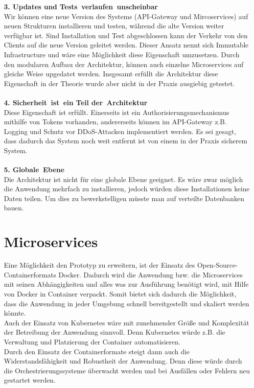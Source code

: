 \textbf{3. Updates und Tests verlaufen unscheinbar}\\
Wir können eine neue Version des Systems (API-Gateway und Mircoservices) auf neuen Strukturen installieren und testen, während die alte Version weiter verfügbar ist. Sind Installation und Test abgeschlossen kann der Verkehr von den Clients auf die neue Version geleitet werden. Dieser Ansatz nennt sich Immutable Infrastructure und wäre eine Möglichkeit diese Eigenschaft umzusetzen. Durch den modularen Aufbau der Architektur, können auch einzelne Microservices auf gleiche Weise upgedatet werden. Insgesamt erfüllt die Architektur diese Eigenschaft in der Theorie wurde aber nicht in der Praxis ausgiebig getestet.\\
\\
\textbf{4. Sicherheit ist ein Teil der Architektur}\\
Diese Eigenschaft ist erfüllt. Einerseits ist ein Authorisierungsmechanismus mithilfe von Tokens vorhanden, andererseits können im API-Gateway z.B. Logging und Schutz vor DDoS-Attacken implementiert werden. Es sei gesagt, dass dadurch das System noch weit entfernt ist von einem in der Praxis sicherem System.\\
\\
\textbf{5. Globale Ebene}\\
Die Architektur ist nicht für eine globale Ebene geeignet. Es wäre zwar möglich die Anwendung mehrfach zu installieren, jedoch würden diese Installationen keine Daten teilen. Um dies zu bewerkstelligen müsste man auf verteilte Datenbanken bauen.

\section{Microservices}
Eine Möglichkeit den Prototyp zu erweitern, ist der Einsatz des Open-Source-Containerformats Docker. Dadurch wird die Anwendung  bzw. die Microservices mit seinen Abhängigkeiten und alles was zur Ausführung benötigt wird, mit Hilfe von Docker in Container verpackt. Somit bietet sich dadurch die Möglichkeit, dass die Anwendung in jeder Umgebung schnell bereitgestellt und skaliert werden könnte.\\
Auch der Einsatz von Kubernetes wäre mit zunehmender Größe und Komplexität der Betreibung der Anwendung sinnvoll. Denn Kubernetes würde z.B. die Verwaltung und Platzierung der Container automatisieren.\\
Durch den Einsatz der Containerformate steigt dann auch die Widerstandsfähigkeit und Robustheit der Anwendung. Denn diese würde durch die Orchestrierungssysteme überwacht werden und bei Ausfällen oder Fehlern neu gestartet werden.
 
